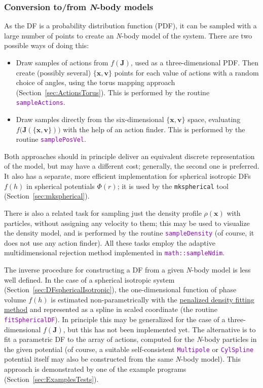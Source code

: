\documentclass[12pt]{article}
\newcommand{\Nbody}{\textsl{N}-body\xspace}
\newcommand{\ttt}[1]{\textcolor{darkviolet}{\texttt{#1}}}
\newcommand{\bv}{\boldsymbol{v}}
\newcommand{\bx}{\boldsymbol{x}}
\newcommand{\bJ}{\boldsymbol{J}}
\begin{document}
\subsubsection{Conversion to/from \Nbody models}  \label{sec:Nbody}

As the DF is a probability distribution function (PDF), it can be sampled with a large number of points to create an \Nbody model of the system. There are two possible ways of doing this:
\begin{itemize}  \setlength{\parskip}{2pt} \setlength{\itemsep}{2pt}
\item Draw samples of actions from $f(\bJ)$, used as a three-dimensional PDF. Then create (possibly several) $\{\bx,\bv\}$ points for each value of actions with a random choice of angles, using the torus mapping approach (Section~\ref{sec:ActionsTorus}). This is performed by the routine \ttt{sampleActions}.
\item Draw samples directly from the six-dimensional $\{\bx,\bv\}$ space, evaluating $f\big(\bJ(\{\bx,\bv\})\big)$ with the help of an action finder. This is performed by the routine \ttt{samplePosVel}.
\end{itemize}
Both approaches should in principle deliver an equivalent discrete representation of the model, but may have a different cost; generally, the second one is preferred. It also has a separate, more efficient implementation for spherical isotropic DFs $f(h)$ in spherical potentials $\Phi(r)$; it is used by the \texttt{mkspherical} tool (Section~\ref{sec:mkspherical}).

There is also a related task for sampling just the density profile $\rho(\bx)$ with particles, without assigning any velocity to them; this may be used to visualize the density model, and is performed by the routine \ttt{sampleDensity} (of course, it does not use any action finder). All these tasks employ the adaptive multidimensional rejection method implemented in \ttt{math::sampleNdim}.

The inverse procedure for constructing a DF from a given \Nbody model is less well defined. In the case of a spherical isotropic system (Section~\ref{sec:DFsphericalIsotropic}), the one-dimensional function of phase volume $f(h)$ is estimated non-parametrically with the \hyperref[sec:SplineFitting]{penalized density fitting method} and represented as a spline in scaled coordinate (the routine \ttt{fitSphericalDF}). In principle this may be generalized for the case of a three-dimensional $f(\bJ)$, but this has not been implemented yet. The alternative is to fit a parametric DF to the array of actions, computed for the \Nbody particles in the given potential (of course, a suitable self-consistent \ttt{Multipole} or \ttt{CylSpline} potential itself may also be constructed from the same \Nbody model). This approach is demonstrated by one of the example programs (Section~\ref{sec:ExamplesTests}).
\end{document}
